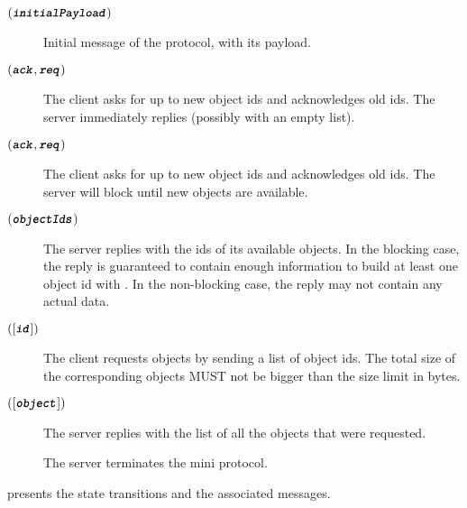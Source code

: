\begin{description}
\item [\MsgInit{} {\((\textbf{\texttt{\textit{initialPayload}}})\)}]
      Initial message of the protocol, with its payload.

\item [\MsgRequestObjIdsNB{} {$(\textbf{\texttt{\textit{ack}}},\textbf{\texttt{\textit{req}}})$}]
      The client asks for up to  new object ids and acknowledges  old ids.
      The server immediately replies (possibly with an empty list).

\item [\MsgRequestObjIdsB{} {$(\textbf{\texttt{\textit{ack}}},\textbf{\texttt{\textit{req}}})$}]
      The client asks for up to  new object ids and acknowledges  old ids.
      The server will block until new objects are available.

\item [\MsgReplyObjIds{} {$(\textbf{\texttt{\textit{objectIds}}})$}]
      The server replies with the ids of its available objects.
      In the blocking case, the reply is guaranteed to contain enough information to build at least one object id with .
      In the non-blocking case, the reply may not contain any actual data.

\item [\MsgRequestObjs{} {$([\textbf{\texttt{\textit{id}}}])$}]
      The client requests objects by sending a list of object ids.
      The total size of the corresponding objects MUST not be bigger than the size limit in bytes.

\item [\MsgReplyObjs{} {$([\textbf{\texttt{\textit{object}}}])$}]
      The server replies with the list of all the objects that were requested.

\item [\MsgDone]
      The server terminates the mini protocol.
\end{description}

 presents the state transitions and the associated messages.

